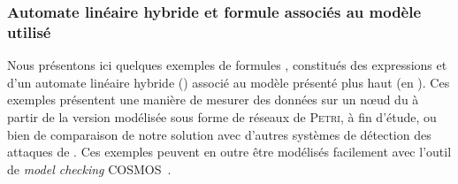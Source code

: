         \subsubsection{Automate linéaire hybride et formule \lsah associés au modèle utilisé}
Nous présentons ici quelques exemples de formules \lsah, constitués des expressions \lsah et d'un automate linéaire hybride (\alh) associé au modèle \rpsge présenté plus haut (en ).
Ces exemples présentent une manière de mesurer des données sur un nœud du \rc à partir de la version modélisée sous forme de réseaux de \textsc{Petri}, à fin d'étude, ou bien de comparaison de notre solution avec d'autres systèmes de détection des attaques de \dds.
Ces exemples peuvent en outre être modélisés facilement avec l'outil de \textit{model checking} \textsf{COSMOS}~\cite{BDDHP11cosmos}.

